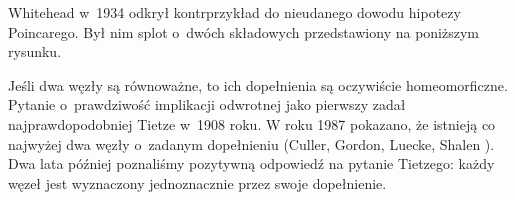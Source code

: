 \begin{example}
%
%
    Whitehead w~1934 odkrył kontrprzykład do nieudanego dowodu hipotezy Poincarego.
    Był nim splot o~dwóch składowych przedstawiony na poniższym rysunku.
\end{example}

Jeśli dwa węzły są równoważne, to ich dopełnienia są oczywiście homeomorficzne.
Pytanie o~prawdziwość implikacji odwrotnej jako pierwszy zadał najprawdopodobniej Tietze \cite{tietze08} w~1908 roku.
%
W roku 1987 pokazano, że istnieją co najwyżej dwa węzły o~zadanym dopełnieniu (Culler, Gordon, Luecke, Shalen \cite{culler87}).
%
%
Dwa lata później poznaliśmy pozytywną odpowiedź na pytanie Tietzego: każdy węzeł jest wyznaczony jednoznacznie przez swoje dopełnienie.

